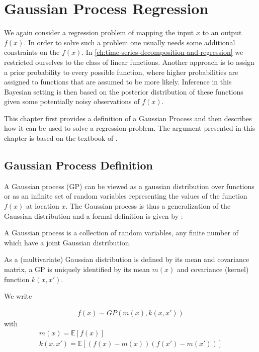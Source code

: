 \chapter{Gaussian Process Regression}\label{ch:gaussian-process-regression}

We again consider a regression problem of mapping the input $x$ to an output $f(x)$.
In order to solve such a problem one usually needs some additional constraints on the $f(x)$.
In \ref{ch:time-series-decomposition-and-regression} we restricted ourselves to the class of linear functions.
Another approach is to assign a prior probability to every possible function, where higher
probabilities are assigned to functions that are assumed to be more likely.
Inference in this Bayesian setting is then based on the posterior distribution of these
functions given some potentially noisy observations of $f(x)$.

This chapter first provides a definition of a Gaussian Process and then describes how it
can be used to solve a regression problem.
The argument presented in this chapter is based on the textbook of \citeauthor{rasmussen_gaussian_2006}.

\section{Gaussian Process Definition}\label{sec:gaussian-process-definition}

A Gaussian process (GP) can be viewed as a gaussian distribution over functions or as an infinite set of random
variables representing the values of the function $f(x)$ at location $x$.
The Gaussian process is thus a generalization of the Gaussian distribution and a formal definition is given
by \citeauthor{rasmussen_gaussian_2006} :

\begin{definition}\label{def:GP}
 A Gaussian process is a collection of random variables, any finite number of which have a joint Gaussian distribution.
\end{definition}


As a (multivariate) Gaussian distribution is defined by its mean and covariance matrix, a GP is
uniquely identified by its mean $m(x)$ and covariance (kernel) function $k(x,x')$.

We write

\begin{gather*}
    f(x) \sim GP(m(x), k(x,x'))
\end{gather*}
with
\begin{gather*}
    m(x) = \mathbb{E}[f(x)] \\
    k(x,x') = \mathbb{E}[(f(x)-m(x))(f(x')-m(x'))]
\end{gather*}

